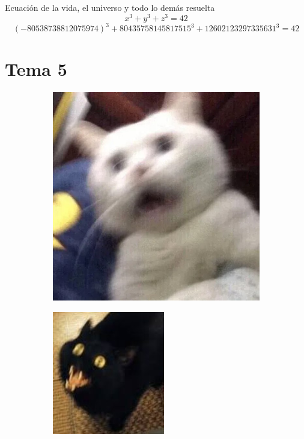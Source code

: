 \begin{defn}  Ecuación de la vida, el universo y todo lo demás resuelta
    $$x^3+y^3+z^3=42$$
    $$(-80538738812075974)^3 + 80435758145817515^3 + 12602123297335631^3 = 42$$
\end{defn}

\lipsum[17-25]
\section{Tema 5} %
\lipsum[26-28]

\begin{figure}
\begin{subfigure}{.5\textwidth}
  \centering
  \includegraphics[width=.8\linewidth]{Capitulos/Figuras/gato_bug.jpg}
  \caption{}
  \label{fig:sfig1}
\end{subfigure}%
\begin{subfigure}{.5\textwidth}
  \centering
  \includegraphics[width=.8\linewidth]{Capitulos/Figuras/gato_bug_2.jpg}

\end{subfigure}
\end{figure}
